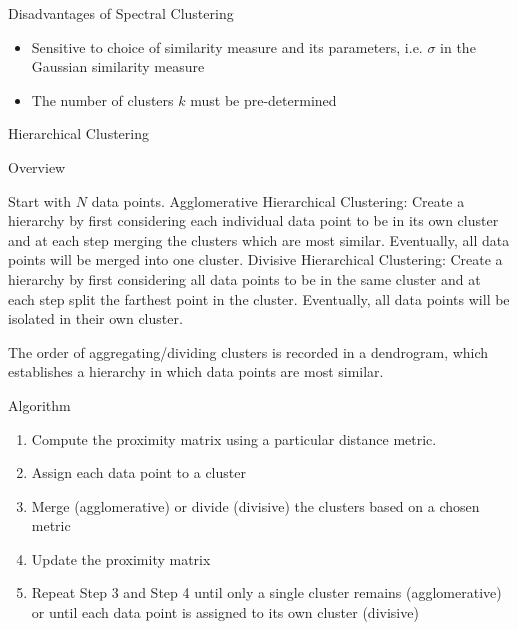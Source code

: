 \documentclass{beamer}
\begin{document}
\begin{frame}{Disadvantages of Spectral Clustering}
    \begin{itemize}
        \item Sensitive to choice of similarity measure and its parameters, i.e. $\sigma$ in the Gaussian similarity measure
        \item The number of clusters $k$ must be pre-determined
    \end{itemize}
\end{frame}


\begin{frame}
\begin{center}
  \textcolor{TennesseeOrange}{\huge Hierarchical Clustering}  
\end{center}
\end{frame}

\begin{frame}{Overview}
\begin{outline} Start with $N$ data points.
    \1 Agglomerative Hierarchical Clustering: Create a hierarchy by first considering each individual data point to be in its own cluster and at each step merging the clusters which are most similar. Eventually, all data points will be merged into one cluster. 
    \1 Divisive Hierarchical Clustering: Create a hierarchy by first considering all data points to be in the same cluster and at each step split the farthest point in the cluster. Eventually, all data points will be isolated in their own cluster. 
\end{outline}
The order of aggregating/dividing clusters is recorded in a dendrogram, which establishes a hierarchy in which data points are most similar.
\end{frame}

\begin{frame}{Algorithm}
    \begin{enumerate}
        \item Compute the proximity matrix using a particular distance metric.
        \item Assign each data point to a cluster
        \item Merge (agglomerative) or divide (divisive) the clusters based on a chosen metric
        \item Update the proximity matrix
        \item Repeat Step 3 and Step 4 until only a single cluster remains (agglomerative) or until each data point is assigned to its own cluster (divisive)
    \end{enumerate}
\end{frame}
\end{document}
